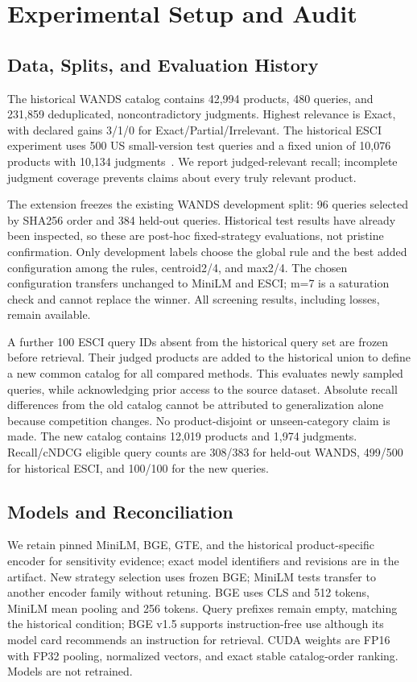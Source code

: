 \section{Experimental Setup and Audit}
\subsection{Data, Splits, and Evaluation History}
The historical WANDS catalog contains 42,994 products, 480 queries, and 231,859 deduplicated, noncontradictory judgments. Highest relevance is Exact, with declared gains 3/1/0 for Exact/Partial/Irrelevant. The historical ESCI experiment uses 500 US small-version test queries and a fixed union of 10,076 products with 10,134 judgments~\cite{chen2022wands,reddy2022shopping}. We report judged-relevant recall; incomplete judgment coverage prevents claims about every truly relevant product.

The extension freezes the existing WANDS development split: 96 queries selected by SHA256 order and 384 held-out queries. Historical test results have already been inspected, so these are post-hoc fixed-strategy evaluations, not pristine confirmation. Only development labels choose the global rule and the best added configuration among the rules, centroid2/4, and max2/4. The chosen configuration transfers unchanged to MiniLM and ESCI; m=7 is a saturation check and cannot replace the winner. All screening results, including losses, remain available.

A further 100 ESCI query IDs absent from the historical query set are frozen before retrieval. Their judged products are added to the historical union to define a new common catalog for all compared methods. This evaluates newly sampled queries, while acknowledging prior access to the source dataset. Absolute recall differences from the old catalog cannot be attributed to generalization alone because competition changes. No product-disjoint or unseen-category claim is made. The new catalog contains 12,019 products and 1,974 judgments. Recall/cNDCG eligible query counts are 308/383 for held-out WANDS, 499/500 for historical ESCI, and 100/100 for the new queries.

\subsection{Models and Reconciliation}
We retain pinned MiniLM, BGE, GTE, and the historical product-specific encoder for sensitivity evidence; exact model identifiers and revisions are in the artifact. New strategy selection uses frozen BGE; MiniLM tests transfer to another encoder family without retuning. BGE uses CLS and 512 tokens, MiniLM mean pooling and 256 tokens. Query prefixes remain empty, matching the historical condition; BGE v1.5 supports instruction-free use although its model card recommends an instruction for retrieval. CUDA weights are FP16 with FP32 pooling, normalized vectors, and exact stable catalog-order ranking. Models are not retrained.

